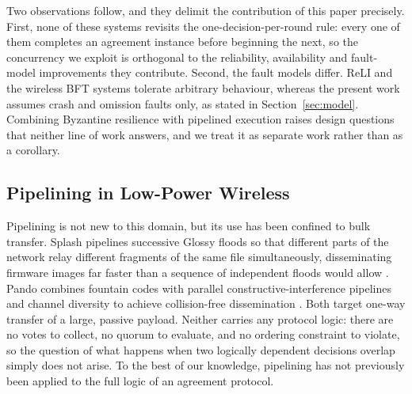 \documentclass[journal]{IEEEtran}
\newcommand{\ReLI}{ReLI}                  %
\begin{document}
Two observations follow, and they delimit the contribution of this paper
precisely. First, none of these systems revisits the
one-decision-per-round rule: every one of them completes an agreement
instance before beginning the next, so the concurrency we exploit is
orthogonal to the reliability, availability and fault-model improvements
they contribute. Second, the fault models differ. {\ReLI} and the wireless
BFT systems tolerate arbitrary behaviour, whereas the present work assumes
crash and omission faults only, as stated in Section~\ref{sec:model}.
Combining Byzantine resilience with pipelined execution raises design
questions that neither line of work answers, and we treat it as separate
work rather than as a corollary.

\subsection{Pipelining in Low-Power Wireless}
\label{sec:back-pipelining}

Pipelining is not new to this domain, but its use has been confined to
bulk transfer. Splash pipelines successive Glossy floods so that different
parts of the network relay different fragments of the same file
simultaneously, disseminating firmware images far faster than a sequence
of independent floods would allow \cite{doddavenkatappa13splash}. Pando
combines fountain codes with parallel constructive-interference pipelines
and channel diversity to achieve collision-free dissemination
\cite{du17pando}. Both target one-way transfer of a large, passive
payload. Neither carries any protocol logic: there are no votes to
collect, no quorum to evaluate, and no ordering constraint to violate, so
the question of what happens when two logically dependent decisions
overlap simply does not arise. To the best of our knowledge, pipelining
has not previously been applied to the full logic of an agreement
protocol.
\end{document}
